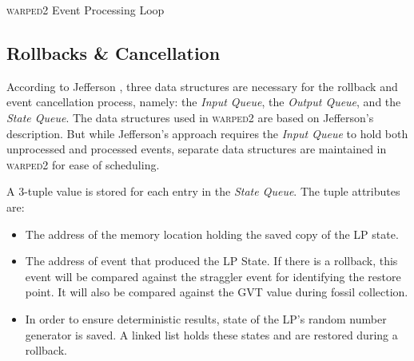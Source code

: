 \documentclass[11pt]{book}
\begin{document}
\begin{algorithm}
\DontPrintSemicolon
{}


\caption{\textsc{warped2} Event Processing Loop}\label{algo:event_loop}
\end{algorithm}

\subsection{Rollbacks \& Cancellation}\label{subsec:rollbacks}

According to Jefferson \cite{jefferson-85}, three data structures are necessary for the rollback and event
cancellation process, namely: the \emph{Input Queue}, the \emph{Output Queue}, and the \emph{State Queue}.
The data structures used in \textsc{warped2} are based on Jefferson's description.  But while Jefferson's
approach requires the \emph{Input Queue} to hold both unprocessed and processed events, separate data
structures are maintained in \textsc{warped2} for ease of scheduling.

A 3-tuple value is stored for each entry in the \emph{State Queue}.  The tuple attributes are:

\begin{itemize}

\item The address of the memory location holding the saved copy of the LP state.
    
\item The address of event that produced the LP State.  If there is a rollback, this event will be compared
  against the straggler event for identifying the restore point.  It will also be compared against the GVT
  value during fossil collection.
    
\item In order to ensure deterministic results, state of the LP's random number generator is saved.  A linked
  list holds these states and are restored during a rollback.

\end{itemize}
\end{document}
